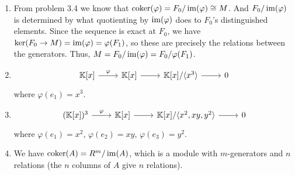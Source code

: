\documentclass[Notebook.tex]{subfiles}
\begin{document}
\begin{solution}
    \bbni
    \begin{enumerate}
        \item From problem 3.4 we know that $\operatorname{coker}(\varphi) = F_0/\operatorname{im}(\varphi) \cong M$. 
        And $F_0/\operatorname{im}(\varphi)$ is determined by what quotienting by $\operatorname{im}(\varphi)$ does to $F_0$'s distinguished elements. Since the sequence is exact at $F_0$, we have $\ker(F_0 \to M) = \operatorname{im}(\varphi) = \varphi(F_1)$, so these are precisely the relations between the generators. Thus, $M = F_0/\operatorname{im}(\varphi) = F_0/\varphi(F_1)$.
        
        \item 
        \[
        \begin{tikzcd}
        \K[x] \arrow[r, "\varphi"] & \K[x] \arrow[r] & \K[x]/\langle x^3 \rangle \arrow[r] & 0
        \end{tikzcd}
        \]
        where $\varphi(e_1) =  x^3$. 

        \item \[
        \begin{tikzcd}
        (\K[x])^3 \arrow[r, "\varphi"] & \K[x] \arrow[r] & \K[x]/\langle x^2, xy, y^2 \rangle \arrow[r] & 0
        \end{tikzcd}
        \]
        where $\varphi(e_1) = x^2, \, \varphi(e_2) = xy, \, \varphi(e_3) = y^2$. 

        \item We have $\operatorname{coker}(A) = R^m/\operatorname{im}(A)$, which is a module with $m$-generators and $n$ relations (the $n$ columns of $A$ give $n$ relations).

    \end{enumerate}    
\end{solution}

\newpage

\hrulefill
\end{document}
